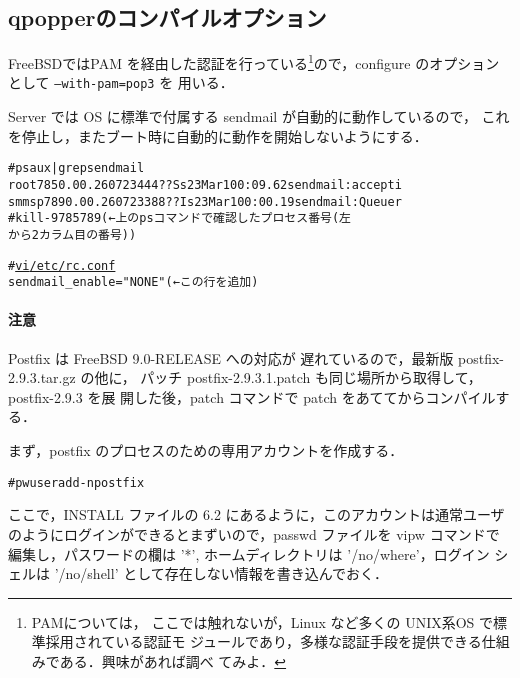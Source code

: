 \subsection*{qpopperのコンパイルオプション}
FreeBSDではPAM を経由した認証を行っている\footnote{PAMについては，
ここでは触れないが，Linux など多くの UNIX系OS で標準採用されている認証モ
ジュールであり，多様な認証手段を提供できる仕組みである．興味があれば調べ
てみよ．}ので，configure のオプションとして \texttt{--with-pam=pop3} を
用いる．



Server では OS に標準で付属する sendmail が自動的に動作しているので，
これを停止し，またブート時に自動的に動作を開始しないようにする．

\begin{center}
\begin{breakbox}
\begin{alltt}
# ps aux | grep sendmail
root    785  0.0  0.2  6072  3444  ??  Ss   23Mar10   0:09.62 sendmail: accepti
smmsp   789  0.0  0.2  6072  3388  ??  Is   23Mar10   0:00.19 sendmail: Queue r
# kill -9 785 789 (← 上の ps コマンドで確認したプロセス番号(左
                               から2カラム目の番号))

# \underline{vi /etc/rc.conf}
sendmail_enable="NONE"     (←この行を追加)

\end{alltt}
\end{breakbox}
\end{center}


\paragraph{注意} Postfix は FreeBSD 9.0-RELEASE への対応が
遅れているので，最新版 postfix-2.9.3.tar.gz の他に，
パッチ postfix-2.9.3.1.patch も同じ場所から取得して，postfix-2.9.3 を展
開した後，patch コマンドで patch をあててからコンパイルする．

まず，postfix のプロセスのための専用アカウントを作成する．

\begin{center}
\begin{breakbox}
\begin{alltt}
#pw useradd -n postfix
\end{alltt}
\end{breakbox}
\end{center}

ここで，INSTALL ファイルの 6.2 にあるように，このアカウントは通常ユーザ
のようにログインができるとまずいので，passwd ファイルを vipw コマンドで
編集し，パスワードの欄は '*', ホームディレクトリは '/no/where'，ログイン
シェルは '/no/shell' として存在しない情報を書き込んでおく．

